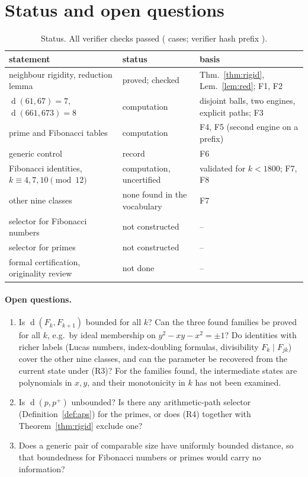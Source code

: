 \documentclass[11pt]{article}
\theoremstyle{definition}
\newcommand{\dist}{\operatorname{d}}
\begin{document}
\section{Status and open questions}\label{sec:status}
\begin{table}[ht]\centering\small
\begin{tabular}{@{}p{}p{}p{}@{}}\toprule
statement & status & basis\\\midrule
neighbour rigidity, reduction lemma & proved; checked & Thm.~\ref{thm:rigid}, Lem.~\ref{lem:red}; F1, F2\\
$\dist(61,67)=7$, $\dist(661,673)=8$ & computation & disjoint balls, two engines, explicit paths; F3\\
prime and Fibonacci tables & computation & F4, F5 (second engine on a prefix)\\
generic control & record & F6\\
Fibonacci identities, $k\equiv4,7,10\pmod{12}$ & computation, uncertified & validated for $k<1800$; F7, F8\\
other nine classes & none found in the vocabulary & F7\\
selector for Fibonacci numbers & not constructed & --\\
selector for primes & not constructed & --\\
formal certification, originality review & not done & --\\\bottomrule
\end{tabular}
\caption{Status. All verifier checks passed (\TotalCases{} cases; verifier hash prefix \texttt{\VerSha}).}\end{table}
\paragraph{Open questions.}
\begin{enumerate}[nosep]
\item Is $\dist(F_k,F_{k+1})$ bounded for all $k$? Can the three found families be proved for all $k$, e.g.\ by ideal membership on $y^2-xy-x^2=\pm1$? Do identities with richer labels (Lucas numbers, index-doubling formulas, divisibility $F_k\mid F_{jk}$) cover the other nine classes, and can the parameter be recovered from the current state under (R3)? For the families found, the intermediate states are polynomials in $x,y$, and their monotonicity in $k$ has not been examined.
\item Is $\dist(p,p^+)$ unbounded? Is there any arithmetic-path selector (Definition~\ref{def:aps}) for the primes, or does (R4) together with Theorem~\ref{thm:rigid} exclude one?
\item Does a generic pair of comparable size have uniformly bounded distance, so that boundedness for Fibonacci numbers or primes would carry no information?
\end{enumerate}
\end{document}
